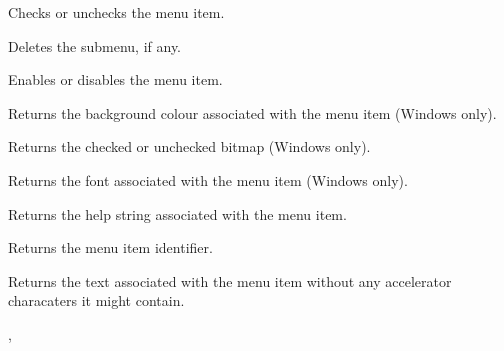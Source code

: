 
Checks or unchecks the menu item.

\label{wxmenuitemdeletesubmenu}


Deletes the submenu, if any.

\label{wxmenuitemenable}


Enables or disables the menu item.

\label{wxmenuitemgetbackgroundcolour}


Returns the background colour associated with the menu item (Windows only).

\label{wxmenuitemgetbitmap}


Returns the checked or unchecked bitmap (Windows only).

\label{wxmenuitemgetfont}


Returns the font associated with the menu item (Windows only).

\label{wxmenuitemgethelp}


Returns the help string associated with the menu item.

\label{wxmenuitemgetid}


Returns the menu item identifier.

\label{wxmenuitemgetlabel}


Returns the text associated with the menu item without any accelerator
characaters it might contain.


,

